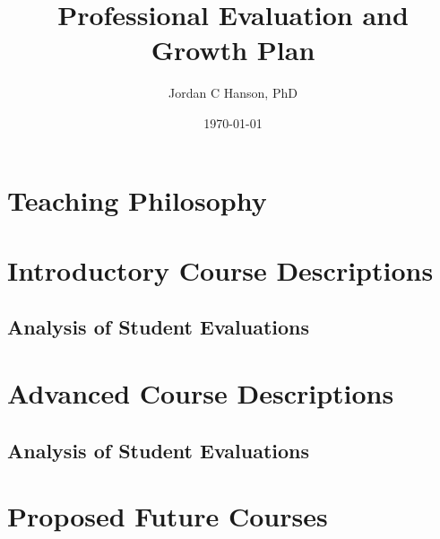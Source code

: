 \documentclass[10pt,oneside]{book}
\title{Professional Evaluation and Growth Plan}
\author{Jordan C Hanson, PhD}
\date{\today}
\begin{document}
\maketitle
\tableofcontents

\clearpage

\section{Teaching Philosophy}

\begin{flushleft}

\end{flushleft}

\section{Introductory Course Descriptions}

\begin{flushleft}

\end{flushleft}

\subsection{Analysis of Student Evaluations}

\begin{flushleft}

\end{flushleft}

\section{Advanced Course Descriptions}

\begin{flushleft}

\end{flushleft}

\subsection{Analysis of Student Evaluations}

\begin{flushleft}

\end{flushleft}

\section{Proposed Future Courses}

\begin{flushleft}

\end{flushleft}



\end{document}
